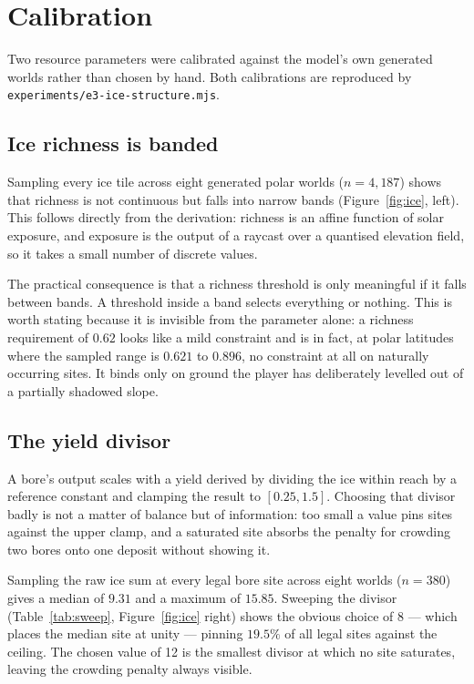 \section{Calibration}
\label{sec:calibration}

Two resource parameters were calibrated against the model's own generated
worlds rather than chosen by hand. Both calibrations are reproduced by
\texttt{experiments/e3-ice-structure.mjs}.

\subsection{Ice richness is banded}

Sampling every ice tile across eight generated polar worlds
($n = 4{,}187$) shows that richness is not continuous but falls into narrow
bands (Figure~\ref{fig:ice}, left). This follows directly from the derivation:
richness is an affine function of solar exposure, and exposure is the output of
a raycast over a quantised elevation field, so it takes a small number of
discrete values.

The practical consequence is that a richness threshold is only meaningful if it
falls between bands. A threshold inside a band selects everything or nothing.
This is worth stating because it is invisible from the parameter alone: a
richness requirement of $0.62$ looks like a mild constraint and is in fact,
at polar latitudes where the sampled range is $0.621$ to $0.896$, no
constraint at all on naturally occurring sites. It binds only on ground the
player has deliberately levelled out of a partially shadowed slope.

\subsection{The yield divisor}

A bore's output scales with a yield derived by dividing the ice within reach by
a reference constant and clamping the result to $[0.25, 1.5]$. Choosing that
divisor badly is not a matter of balance but of information: too small a value
pins sites against the upper clamp, and a saturated site absorbs the penalty
for crowding two bores onto one deposit without showing it.

Sampling the raw ice sum at every legal bore site across eight worlds
($n = 380$) gives a median of $9.31$ and a maximum of $15.85$. Sweeping the
divisor (Table~\ref{tab:sweep}, Figure~\ref{fig:ice} right) shows the obvious
choice of 8 --- which places the median site at unity --- pinning $19.5\%$ of
all legal sites against the ceiling. The chosen value of 12 is the smallest
divisor at which no site saturates, leaving the crowding penalty always
visible.

